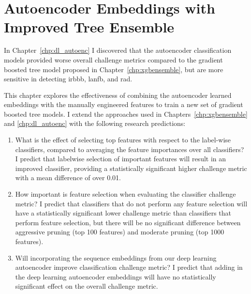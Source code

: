 \documentclass[\main/thesis.tex]{subfiles}
\begin{document}
\chapter{Autoencoder Embeddings with Improved Tree Ensemble}
\label{chp:aencxgb}

In Chapter~\ref{chp:dl_autoenc} I discovered that the autoencoder classification models provided worse overall challenge metrics compared to the gradient boosted tree model proposed in Chapter~\ref{chp:xgbensemble}, but are more sensitive in detecting \gls{irbbb}, \gls{lanfb}, and \gls{rad}.

This chapter explores the effectiveness of combining the autoencoder learned embeddings with the manually engineered features to train a new set of gradient boosted tree models.
I extend the approaches used in Chapters~\ref{chp:xgbensemble} and \ref{chp:dl_autoenc} with the following research predictions:
\begin{enumerate}[label=RQ\arabic*,itemindent=0.8em,start=1]
    \item \label{question:xgb_aenc_avg_vs_lab} What is the effect of selecting top features with respect to the label-wise classifiers, compared to averaging the feature importances over all classifiers?
    I predict that labelwise selection of important features will result in an improved classifier, providing a statistically significant higher challenge metric with a mean difference of over 0.01.
    \item \label{question:xgb_aenc_pruning} How important is feature selection when evaluating the classifier challenge metric?
    I predict that classifiers that do not perform any feature selection will have a statistically significant lower challenge metric than classifiers that perform feature selection, but there will be no significant difference between aggressive pruning (top 100 features) and moderate pruning (top 1000 features).
    \item \label{question:xgb_aenc_embd_vs_no_embd} Will incorporating the sequence embeddings from our deep learning autoencoder improve classification challenge metric?
    I predict that adding in the deep learning autoencoder embeddings will have no statistically significant effect on the overall challenge metric.
\end{enumerate}
\end{document}

